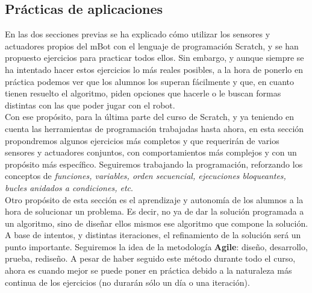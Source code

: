 \subsection{Prácticas de aplicaciones}\label{subsec:practicasaplicaciones}
En las dos secciones previas se ha explicado cómo utilizar los sensores y actuadores propios del mBot con el lenguaje de programación Scratch, y se han propuesto ejercicios para practicar todos ellos. Sin embargo, y aunque siempre se ha intentado hacer estos ejercicios lo más reales posibles, a la hora de ponerlo en práctica podemos ver que los alumnos los superan fácilmente y que, en cuanto tienen resuelto el algoritmo, piden opciones que hacerle o le buscan formas distintas con las que poder jugar con el robot. \\
Con ese propósito, para la última parte del curso de Scratch, y ya teniendo en cuenta las herramientas de programación trabajadas hasta ahora, en esta sección propondremos algunos ejercicios más completos y que requerirán de varios sensores y actuadores conjuntos, con comportamientos más complejos y con un propósito más específico. Seguiremos trabajando la programación, reforzando los conceptos de \textit{funciones, variables, orden secuencial, ejecuciones bloqueantes, bucles anidados a condiciones, etc}. \\
Otro propósito de esta sección es el aprendizaje y autonomía de los alumnos a la hora de solucionar un problema. Es decir, no ya de dar la solución programada a un algoritmo, sino de diseñar ellos mismos ese algoritmo que compone la solución. A base de intentos, y distintas iteraciones, el refinamiento de la solución será un punto importante. Seguiremos la idea de la metodología \textbf{Agile}: diseño, desarrollo, prueba, rediseño. A pesar de haber seguido este método durante todo el curso, ahora es cuando mejor se puede poner en práctica debido a la naturaleza más continua de los ejercicios (no durarán sólo un día o una iteración).

